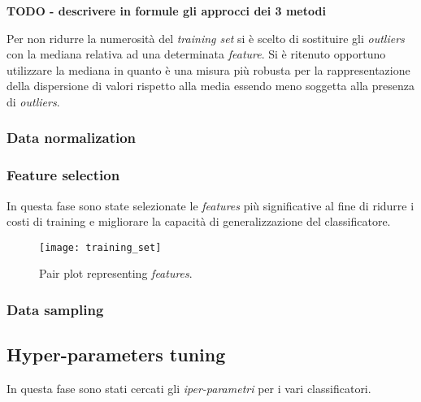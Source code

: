                         \textbf{TODO - descrivere in formule gli approcci dei 3 metodi}
                        
                        Per non ridurre la numerosità del \textit{training set} si è scelto di sostituire gli \textit{outliers} con la mediana relativa ad una determinata \textit{feature}. Si è ritenuto opportuno utilizzare la mediana in quanto è una misura più robusta per la rappresentazione della dispersione di valori rispetto alla media essendo meno soggetta alla presenza di \textit{outliers}.                        
                
                \subsubsection{Data normalization}
                
                \subsubsection{Feature selection}
                
                        In questa fase sono state selezionate le \textit{features} più significative al fine di ridurre i costi di training e migliorare la capacità di generalizzazione del classificatore.
                        
                        \begin{figure}[!h]
                            \centering
                            \texttt{[image: training\_set]}
                            \caption{Pair plot representing \textit{features}.}
                            \label{fig:training_set_pairplot}
                        \end{figure}
                        \clearpage
                
                \subsubsection{Data sampling}  
                
                

        \subsection{Hyper-parameters tuning}
        
                In questa fase sono stati cercati gli \textit{iper-parametri} per i vari classificatori.